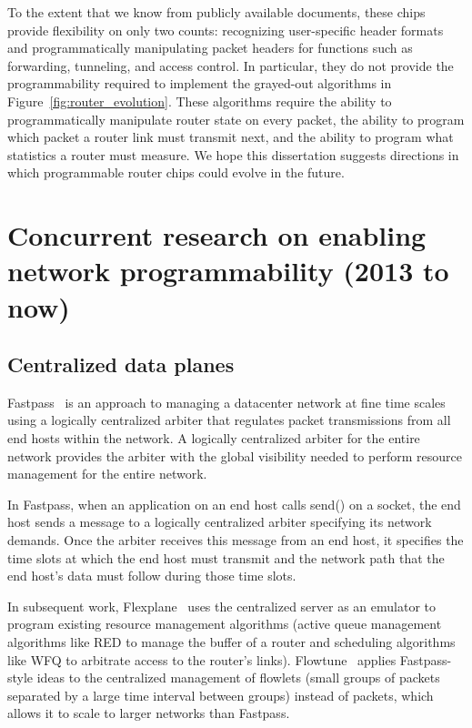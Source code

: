 To the extent that we know from publicly available documents, these chips
provide flexibility on only two counts: recognizing user-specific header
formats and programmatically manipulating packet headers for functions such as
forwarding, tunneling, and access control. In particular, they do not provide
the programmability required to implement the grayed-out algorithms in
Figure~\ref{fig:router_evolution}.  These algorithms require the ability to
programmatically manipulate router state on every packet, the ability to
program which packet a router link must transmit next, and the ability to
program what statistics a router must measure. We hope this dissertation
suggests directions in which programmable router chips could evolve in the
future.

\section{Concurrent research on enabling network programmability (2013 to now)}

\subsection{Centralized data planes}
Fastpass~\cite{fastpass} is an approach to managing a datacenter network at
fine time scales using a logically centralized arbiter that regulates packet
transmissions from all end hosts within the network. A logically centralized
arbiter for the entire network provides the arbiter with the global visibility
needed to perform resource management for the entire network. 

In Fastpass, when an application on an end host calls send() on a socket, the
end host sends a message to a logically centralized arbiter specifying its
network demands. Once the arbiter receives this message from an end host, it
specifies the time slots at which the end host must transmit and the network
path that the end host's data must follow during those time slots. 

In subsequent work, Flexplane~\cite{flexplane} uses the centralized server as
an emulator to program existing resource management algorithms (\eg active
queue management algorithms like RED to manage the buffer of a router and
scheduling algorithms like WFQ to arbitrate access to the router's links).
Flowtune~\cite{flowtune} applies Fastpass-style ideas to the centralized
management of flowlets (small groups of packets separated by a large time
interval between groups) instead of packets, which allows it to scale to larger
networks than Fastpass.

